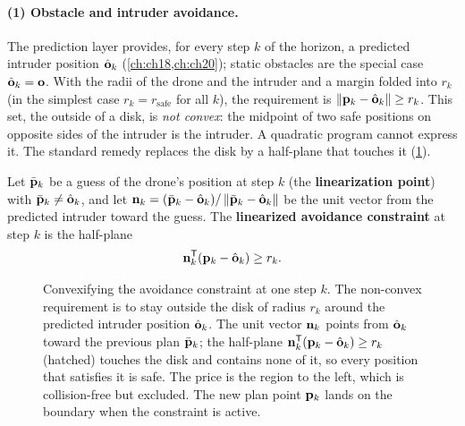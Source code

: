 \paragraph{(1) Obstacle and intruder avoidance.}
The prediction layer provides, for every step $k$ of the horizon, a predicted
intruder position $\hat{\mathbf{o}}_k$ (\cref{ch:ch18,ch:ch20}); static
obstacles are the special case $\hat{\mathbf{o}}_k=\mathbf{o}$. With the radii of
the drone and the intruder and a margin folded into $r_k$ (in the simplest
case $r_k=r_{\mathrm{safe}}$ for all $k$), the requirement is
$\left\lVert \mathbf{p}_k-\hat{\mathbf{o}}_k \right\rVert\ge r_k$. This set, the outside of a disk, is
\emph{not convex}: the midpoint of two safe positions on opposite sides of the
intruder is the intruder. A quadratic program cannot express it. The standard
remedy replaces the disk by a half-plane that touches it
(\cref{fig:ch21-halfplane}).

\begin{definition}
\label{def:ch21-halfplane}
Let $\bar{\mathbf{p}}_k$ be a guess of the drone's position at step $k$ (the
\textbf{linearization point}) with
$\bar{\mathbf{p}}_k\ne\hat{\mathbf{o}}_k$, and let
$\mathbf{n}_k=(\bar{\mathbf{p}}_k-\hat{\mathbf{o}}_k)/\left\lVert \bar{\mathbf{p}}_k-\hat{\mathbf{o}}_k \right\rVert$
be the unit vector from the predicted intruder toward the guess. The
\textbf{linearized avoidance constraint}
at step $k$ is the half-plane
\begin{equation}
\mathbf{n}_k^{\mathsf{T}}(\mathbf{p}_k-\hat{\mathbf{o}}_k)\ge r_k .
\label{eq:ch21-halfplane}
\end{equation}
\end{definition}

\begin{figure}[tb]
  \centering
  \caption{Convexifying the avoidance constraint at one step $k$. The
  non-convex requirement is to stay outside the disk of radius $r_k$ around
  the predicted intruder position $\hat{\mathbf{o}}_k$. The unit vector
  $\mathbf{n}_k$ points from $\hat{\mathbf{o}}_k$ toward the previous plan
  $\bar{\mathbf{p}}_k$; the half-plane $\mathbf{n}_k^{\mathsf{T}}(\mathbf{p}_k-\hat{\mathbf{o}}_k)\ge r_k$
  (hatched) touches the disk and contains none of it, so every position that
  satisfies it is safe. The price is the region to the left, which is
  collision-free but excluded. The new plan point $\mathbf{p}_k$ lands on the
  boundary when the constraint is active.}
  \label{fig:ch21-halfplane}
\end{figure}

